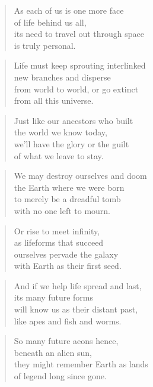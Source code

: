 \documentclass[14pt,a4paper]{article}
\begin{document}
\begin{verse}
As each of us is one more face\\
of life behind us all,\\
its need to travel out through space\\
is truly personal.
\end{verse}

\begin{verse}
Life must keep sprouting interlinked\\
new branches and disperse\\
from world to world, or go extinct\\
from all this universe.
\end{verse}

\begin{verse}
Just like our ancestors who built\\
the world we know today,\\
we’ll have the glory or the guilt\\
of what we leave to stay.
\end{verse}

\begin{verse}
We may destroy ourselves and doom\\
the Earth where we were born\\
to merely be a dreadful tomb\\
with no one left to mourn.
\end{verse}

\begin{verse}
Or rise to meet infinity,\\
as lifeforms that succeed\\
ourselves pervade the galaxy\\
with Earth as their first seed.
\end{verse}

\begin{verse}
And if we help life spread and last,\\
its many future forms\\
will know us as their distant past,\\
like apes and fish and worms.
\end{verse}

\begin{verse}
So many future aeons hence,\\
beneath an alien sun,\\
they might remember Earth as lands\\
of legend long since gone.
\end{verse}
\end{document}
